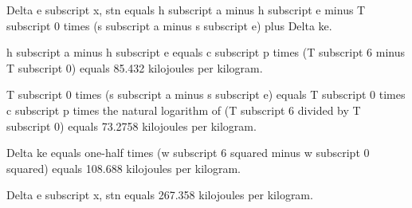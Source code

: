 Delta e subscript x, stn equals h subscript a minus h subscript e minus T subscript 0 times (s subscript a minus s subscript e) plus Delta ke.

h subscript a minus h subscript e equals c subscript p times (T subscript 6 minus T subscript 0) equals 85.432 kilojoules per kilogram.

T subscript 0 times (s subscript a minus s subscript e) equals T subscript 0 times c subscript p times the natural logarithm of (T subscript 6 divided by T subscript 0) equals 73.2758 kilojoules per kilogram.

Delta ke equals one-half times (w subscript 6 squared minus w subscript 0 squared) equals 108.688 kilojoules per kilogram.

Delta e subscript x, stn equals 267.358 kilojoules per kilogram.